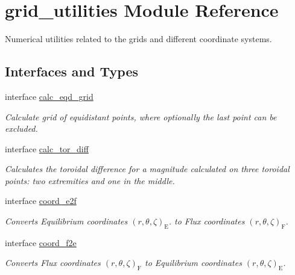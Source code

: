 \hypertarget{namespacegrid__utilities}{}\section{grid\+\_\+utilities Module Reference}
\label{namespacegrid__utilities}


Numerical utilities related to the grids and different coordinate systems.  


\subsection*{Interfaces and Types}
\begin{DoxyCompactItemize}
\item 
interface \hyperlink{interfacegrid__utilities_1_1calc__eqd__grid}{calc\+\_\+eqd\+\_\+grid}
\begin{DoxyCompactList}\small\item\em Calculate grid of equidistant points, where optionally the last point can be excluded. \end{DoxyCompactList}\item 
interface \hyperlink{interfacegrid__utilities_1_1calc__tor__diff}{calc\+\_\+tor\+\_\+diff}
\begin{DoxyCompactList}\small\item\em Calculates the toroidal difference for a magnitude calculated on three toroidal points\+: two extremities and one in the middle. \end{DoxyCompactList}\item 
interface \hyperlink{interfacegrid__utilities_1_1coord__e2f}{coord\+\_\+e2f}
\begin{DoxyCompactList}\small\item\em Converts Equilibrium coordinates $\left(r,\theta,\zeta\right)_\text{E}$. to Flux coordinates $\left(r,\theta,\zeta\right)_\text{F}$. \end{DoxyCompactList}\item 
interface \hyperlink{interfacegrid__utilities_1_1coord__f2e}{coord\+\_\+f2e}
\begin{DoxyCompactList}\small\item\em Converts Flux coordinates $\left(r,\theta,\zeta\right)_\text{F}$ to Equilibrium coordinates $\left(r,\theta,\zeta\right)_\text{E}$. \end{DoxyCompactList}\end{DoxyCompactItemize}
